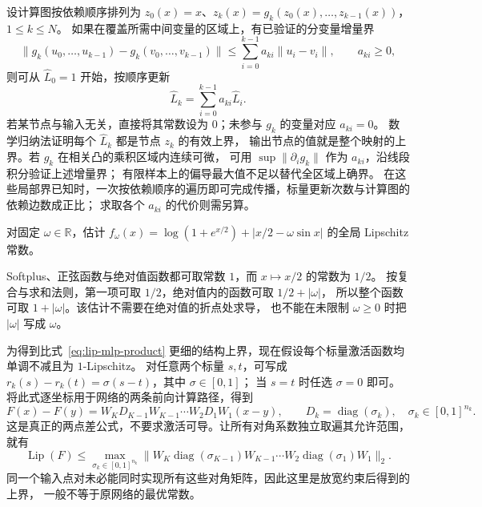\documentclass[UTF8,12pt,a4paper,fontset=fandol]{ctexart}
\begin{document}
设计算图按依赖顺序排列为
$z_0(x)=x$、$z_k(x)=g_k(z_0(x),\ldots,z_{k-1}(x))$，$1\le k\le N$。
如果在覆盖所需中间变量的区域上，有已验证的分变量增量界
\[
  \|g_k(u_0,\ldots,u_{k-1})-g_k(v_0,\ldots,v_{k-1})\|
  \le\sum_{i=0}^{k-1}a_{ki}\|u_i-v_i\|,\qquad a_{ki}\ge0,
\]
则可从 $\widehat L_0=1$ 开始，按顺序更新
\begin{equation}\label{eq:lip-autolip}
  \widehat L_k=\sum_{i=0}^{k-1}a_{ki}\widehat L_i.
\end{equation}
若某节点与输入无关，直接将其常数设为 $0$；未参与 $g_k$ 的变量对应 $a_{ki}=0$。
数学归纳法证明每个 $\widehat L_k$ 都是节点 $z_k$ 的有效上界，
输出节点的值就是整个映射的上界。若 $g_k$ 在相关凸的乘积区域内连续可微，
可用 $\sup\|\partial_i g_k\|$ 作为 $a_{ki}$，沿线段积分验证上述增量界；
有限样本上的偏导最大值不足以替代全区域上确界。
在这些局部界已知时，一次按依赖顺序的遍历即可完成传播，标量更新次数与计算图的依赖边数成正比；
求取各个 $a_{ki}$ 的代价则需另算。

\begin{example}\label{ex:lip-autolip}
对固定 $\omega\in\mathbb R$，估计
$f_\omega(x)=\log(1+e^{x/2})+|x/2-\omega\sin x|$ 的全局 Lipschitz 常数。
\end{example}
\begin{solve}
Softplus、正弦函数与绝对值函数都可取常数 $1$，而 $x\mapsto x/2$ 的常数为 $1/2$。
按复合与求和法则，第一项可取 $1/2$，绝对值内的函数可取 $1/2+|\omega|$，
所以整个函数可取 $1+|\omega|$。该估计不需要在绝对值的折点处求导，
也不能在未限制 $\omega\ge0$ 时把 $|\omega|$ 写成 $\omega$。
\end{solve}

为得到比式~\eqref{eq:lip-mlp-product} 更细的结构上界，现在假设每个标量激活函数均单调不减且为 $1$-Lipschitz。
对任意两个标量 $s,t$，可写成
$r_k(s)-r_k(t)=\sigma(s-t)$，其中 $\sigma\in[0,1]$；
当 $s=t$ 时任选 $\sigma=0$ 即可。将此式逐坐标用于网络的两条前向计算路径，得到
\[
  F(x)-F(y)=W_KD_{K-1}W_{K-1}\cdots W_2D_1W_1(x-y),
  \qquad D_k=\operatorname{diag}(\sigma_k),\quad \sigma_k\in[0,1]^{n_k}.
\]
这是真正的两点差公式，不要求激活可导。让所有对角系数独立取遍其允许范围，就有
\begin{equation}\label{eq:lip-gate-relaxation}
  \operatorname{Lip}(F)
  \le \max_{\sigma_k\in[0,1]^{n_k}}
    \|W_K\operatorname{diag}(\sigma_{K-1})W_{K-1}
      \cdots W_2\operatorname{diag}(\sigma_1)W_1\|_2.
\end{equation}
同一个输入点对未必能同时实现所有这些对角矩阵，因此这里是放宽约束后得到的上界，
一般不等于原网络的最优常数。
\end{document}
